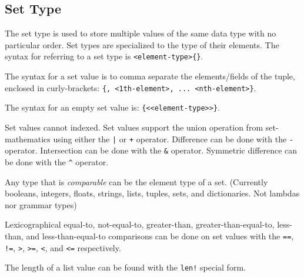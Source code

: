 
\subsection{Set Type}
{
	The set type is used to store
	multiple values of the same data type with no
	particular order.
	Set types are specialized to the type of their elements.
	The syntax for referring to a set type
	is \texttt{<element-type>\{\}}.
	
	The syntax for a set value is to comma separate the elements/fields
	of the tuple, enclosed in
	curly-brackets: \texttt{\{<0th-element>, <1th-element>, ... <nth-element>\}}.
	
	The syntax for an empty set value is: \texttt{\{<<element-type>>\}}.
	
	Set values cannot indexed.
	Set values support the union operation from set-mathematics using
	either the \texttt{|} or \texttt{+} operator.
	Difference can be done with the \texttt{-} operator.
	Intersection can be done with the \texttt{\&} operator.
	Symmetric difference can be done with the \texttt{\^} operator.
	
	Any type that is \textit{comparable} can be the element type of a set.
	(Currently booleans, integers, floats, strings, lists, tuples,
		sets, and dictionaries. Not lambdas nor grammar types)
	
	Lexicographical equal-to, not-equal-to, greater-than, greater-than-equal-to,
	less-than, and less-than-equal-to comparisons
	can be done on set values with
	the \texttt{==}, \texttt{!=},
	\texttt{>}, \texttt{>=}, \texttt{<}, and \texttt{<=} respectively.
	
	The length of a list value can be found with the \texttt{len!} special form.
}
